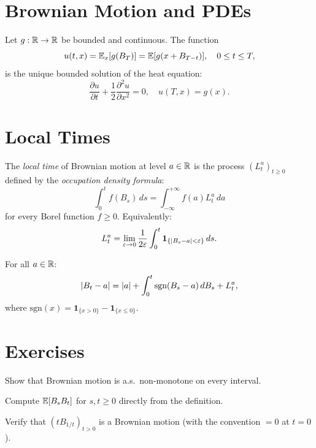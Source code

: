 \section{Brownian Motion and PDEs}

\begin{theorem}
\label{thm:feynman_kac}
Let $g : \mathbb{R} \to \mathbb{R}$ be bounded and continuous. The function
\[
  u(t, x) = \mathbb{E}_x[g(B_T)] = \mathbb{E}[g(x + B_{T-t})], \quad 0 \leq t \leq T,
\]
is the unique bounded solution of the heat equation:
\[
  \frac{\partial u}{\partial t} + \frac{1}{2} \frac{\partial^2 u}{\partial x^2} = 0,
  \quad u(T, x) = g(x).
\]
\end{theorem}

\section{Local Times}

\begin{definition}
The \emph{local time} of Brownian motion at level $a \in \mathbb{R}$ is the process
$(L_t^a)_{t \geq 0}$ defined by the \emph{occupation density formula}:
\[
  \int_0^t f(B_s) \, ds = \int_{-\infty}^{+\infty} f(a) L_t^a \, da
\]
for every Borel function $f \geq 0$. Equivalently:
\[
  L_t^a = \lim_{\varepsilon \to 0} \frac{1}{2\varepsilon}
  \int_0^t \mathbf{1}_{\{\left| B_s - a \right| < \varepsilon\}} \, ds.
\]
\end{definition}

\begin{theorem}
\label{thm:tanaka}
For all $a \in \mathbb{R}$:
\[
  \left| B_t - a \right| = \left| a \right| + \int_0^t \text{sgn}(B_s - a) \, dB_s + L_t^a,
\]
where $\text{sgn}(x) = \mathbf{1}_{\{x > 0\}} - \mathbf{1}_{\{x \leq 0\}}$.
\end{theorem}

\section{Exercises}

\begin{exercise}
Show that Brownian motion is a.s.\ non-monotone on every interval.
\end{exercise}

\begin{exercise}
Compute $\mathbb{E}[B_s B_t]$ for $s, t \geq 0$ directly from the definition.
\end{exercise}

\begin{exercise}
Verify that $(t B_{1/t})_{t > 0}$ is a Brownian motion (with the convention
$= 0$ at $t = 0$).
\end{exercise}

